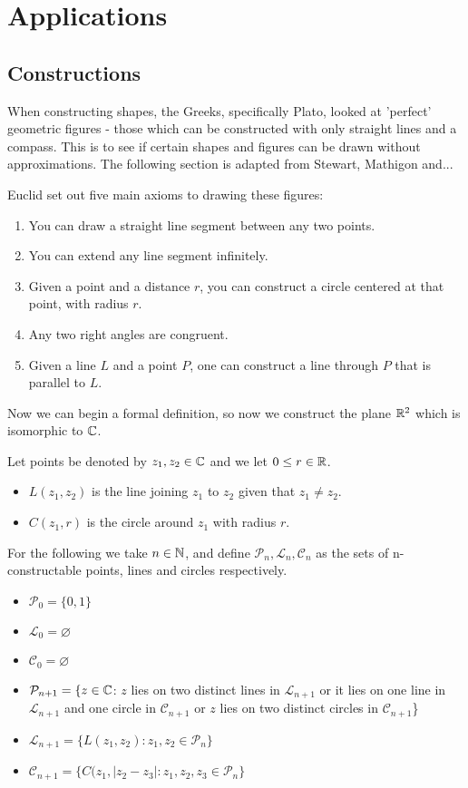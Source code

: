 \section{Applications} \label{sec:applications}

\subsection{Constructions}
When constructing shapes, the Greeks, specifically Plato, looked at 'perfect' geometric figures - those which can be constructed with only straight lines and a compass. This is to see if certain shapes and figures can be drawn without approximations. The following section is adapted from Stewart, Mathigon and...

Euclid set out five main axioms to drawing these figures:

\begin{enumerate}
    \item You can draw a straight line segment between any two points.
    \item You can extend any line segment infinitely.
    \item Given a point and a distance $r$, you can construct a circle centered at that point, with radius $r$.
    \item Any two right angles are congruent.
    \item Given a line $L$ and a point $P$, one can construct a line through $P$ that is parallel to $L$. 
\end{enumerate}

Now we can begin a formal definition, so now we construct the plane $\mathbb R^2$ which is isomorphic to $\mathbb C$. 
\begin{definition}
Let points be denoted by $z_1,z_2 \in \mathbb C$ and we let $0\leq r \in \mathbb R$.
    \begin{itemize}
        \item $L(z_1,z_2)$ is the line joining $z_1$ to $z_2$ given that $z_1 \neq z_2$.
        \item $C(z_1,r)$ is the circle around $z_1$ with radius $r$.
    \end{itemize}
    For the following we take $n \in \mathbb N$, and define $\mathcal{P}_n,\mathcal{L}_n,\mathcal{C}_n$ as the sets of n-constructable points, lines and circles respectively.
    \begin{itemize}
        \item $\mathcal{P}_0=\{0,1\}$
        \item $\mathcal{L}_0=\varnothing$
        \item $\mathcal{C}_0=\varnothing$
        \item $\mathcal{P}_{n+1}=\{z\in \mathbb C $: $z$ lies on two distinct lines in $\mathcal{L}_{n+1}$ or it lies on one line in $\mathcal{L}_{n+1}$ and one circle in $\mathcal{C}_{n+1}$ or $z$ lies on two distinct circles in $\mathcal{C}_{n+1}$\}
        \item $\mathcal{L}_{n+1}=\{L(z_1,z_2) : z_1,z_2\in \mathcal{P}_n\}$
        \item $\mathcal{C}_{n+1}=\{C(z_1,|z_2-z_3|:z_1,z_2,z_3\in \mathcal{P}_n\}$
    \end{itemize}
\end{definition}

